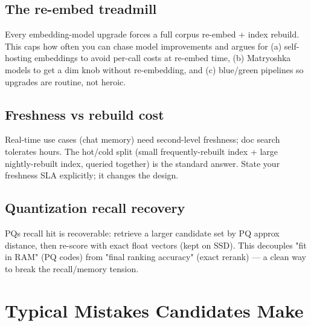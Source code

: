 \documentclass[11pt]{article}
\begin{document}
\subsection{The re-embed treadmill}\label{the-re-embed-treadmill}

Every embedding-model upgrade forces a full corpus re-embed + index rebuild. This caps how often you can chase model improvements and argues for (a) self-hosting embeddings to avoid per-call costs at re-embed time, (b) Matryoshka models to get a dim knob without re-embedding, and (c) blue/green pipelines so upgrades are routine, not heroic.

\subsection{Freshness vs rebuild cost}\label{freshness-vs-rebuild-cost}

Real-time use cases (chat memory) need second-level freshness; doc search tolerates hours. The hot/cold split (small frequently-rebuilt index + large nightly-rebuilt index, queried together) is the standard answer. State your freshness SLA explicitly; it changes the design.

\subsection{Quantization recall recovery}\label{quantization-recall-recovery}

PQ\textquotesingle s recall hit is recoverable: retrieve a larger candidate set by PQ approx distance, then re-score with exact float vectors (kept on SSD). This decouples "fit in RAM" (PQ codes) from "final ranking accuracy" (exact rerank) --- a clean way to break the recall/memory tension.

\section{Typical Mistakes Candidates Make}\label{typical-mistakes-candidates-make}
\end{document}
